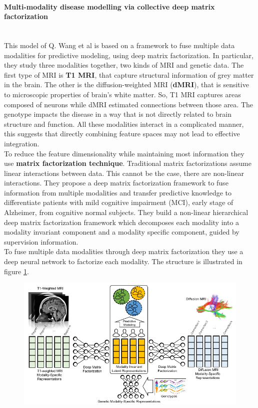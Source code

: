 \paragraph{Multi-modality disease modelling via collective deep matrix factorization}\
\\

This model of Q. Wang et al \cite{10.1145/3097983.3098164} is based on a framework to fuse multiple data modalities for predictive modeling, using deep matrix factorization. In particular, they study three modalities together, two kinds of MRI and genetic data. The first type of MRI is \textbf{T1 MRI}, that capture structural information of grey matter in the brain. The other is the diffusion-weighted MRI (\textbf{dMRI}), that is sensitive to microscopic properties of brain's white matter. So, T1 MRI captures areas composed of neurons while dMRI estimated connections between those area. The genotype impacts the disease in a way that is not directly related to brain structure and function. All these modalities interact in a complicated manner, this suggests that directly combining feature spaces may not lead to effective integration.
\\

To reduce the feature dimensionality while maintaining most information they use \textbf{matrix factorization technique}. Traditional matrix factorizations assume linear interactions between data. This cannot be the case, there are non-linear interactions. They propose a deep matrix factorization framework to fuse information from multiple modalities and transfer predictive knowledge to differentiate patients with mild cognitive impairment (MCI), early stage of Alzheimer, from cognitive normal subjects. They build a non-linear hierarchical deep matrix factorization framework which decomposes each modality into a modality invariant component and a modality specific component, guided by supervision information. 
\\

To fuse multiple data modalities through deep matrix factorization they use a deep neural network to factorize each modality. The structure is illustrated in figure \ref{fig:diagram17}.

\begin{figure}[htbp]
	\centering
	\includegraphics[scale=0.65]{Immagini/multimodality.PNG}
	\caption{\label{fig:diagram17}}
\end{figure}


